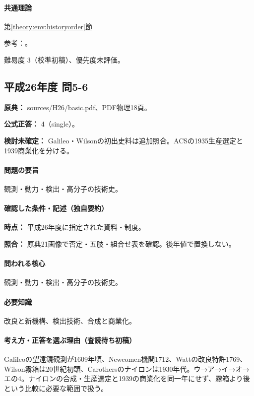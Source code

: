\paragraph{共通理論} \hyperref[theory:env:historyorder]{第\ref*{theory:env:historyorder}節}

\par 参考：\cite{env58_steam}。

\par 難易度 3（校準初稿）、優先度未評価。

\subsection{平成26年度 問5-6}
\label{q:h26-reg-basic-5-6}

\noindent\textbf{原典：} sources/H26/basic.pdf、PDF物理18頁。

\textbf{公式正答：} 4（single）。

\par\textbf{検討未確定：} Galileo・Wilsonの初出史料は追加照合。ACSの1935生産選定と1939商業化を分ける。

\paragraph{問題の要旨} 観測・動力・検出・高分子の技術史。

\paragraph{確認した条件・記述（独自要約）}\mbox{}\par

\noindent\textbf{時点：} 平成26年度に指定された資料・制度。\par

\noindent\textbf{照合：} 原典21画像で否定・五肢・組合せ表を確認。後年値で置換しない。\par

\paragraph{問われる核心} 観測・動力・検出・高分子の技術史。

\paragraph{必要知識} 改良と新機構、検出技術、合成と商業化。

\paragraph{考え方・正答を選ぶ理由（査読待ち初稿）} Galileoの望遠鏡観測が1609年頃、Newcomen機関1712、Wattの改良特許1769、Wilson霧箱は20世紀初頭、Carothersのナイロンは1930年代。ウ→ア→イ→オ→エの4。ナイロンの合成・生産選定と1939の商業化を同一年にせず、霧箱より後という比較に必要な範囲で扱う。

